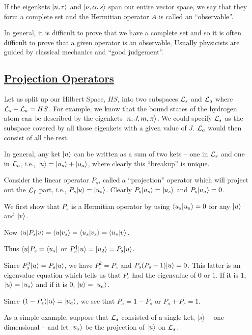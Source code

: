 If the eigenkets $|n,r\rangle$ and $|\nu,\alpha,s\rangle$ span our entire vector space, we say that they form a complete set and the Hermitian operator $A$ is called an ``observable''.\label{observable}

In general, it is difficult to prove that we have a complete set and so it is often difficult to prove that a given operator is an observable, Usually physicists are guided by classical mechanics and ``good judgement''.

\subsection{\underline{Projection Operators}}
Let us split up our Hilbert Space, $HS$, into two subspaces ${\cal{L}}_s$ and ${\cal{L}}_a$ where ${\cal{L}}_s + {\cal{L}}_a = HS$. For example, we know that the bound states of the hydrogen atom can be described by the 
eigenkets $|n,J,m,\pi\rangle$. We could specify ${\cal{L}}_s$ as the subspace covered by all those eigenkets with a given value of $J$. ${\cal{L}}_a$ would then consist of all the rest. 

In general, any ket $|u\rangle$ can be written as a sum of two kets -- one in ${\cal{L}}_s$ and one in ${\cal{L}}_a$, i.e., $|u\rangle = |u_s\rangle + |u_a\rangle$, where clearly this ``breakup'' is unique. 

Consider the linear operator $P_s$, called a ``projection'' operator which will project out the $\cal{L}_s$ part, i.e., $P_s|u\rangle = |u_s\rangle$. Clearly $P_s|u_s\rangle = |u_s\rangle$ and $P_s|u_a\rangle = 0$. 

We first show that $P_s$ is a Hermitian operator by using $\langle u_s|u_a\rangle = 0$ for any $|u\rangle$ and $|v\rangle$. 

Now $\langle u| P_s| v \rangle = \langle u|v_s\rangle = \langle u_s|v_s\rangle = \langle u_s|v\rangle$.

Thus $\langle u|P_s = \langle u_s|$ or $P_s^\dagger|u\rangle = |u_2\rangle = P_s|u\rangle$.

Since $P_s^2 |u\rangle = P_s|u\rangle$, we have $P_s^2 = P_s$ and $P_s(P_s -1)|u\rangle = 0$. This latter is an eigenvalue equation which tells us that $P_s$ had the eigenvalue of $0$ or $1$. If it is $1$, $|u\rangle = |u_s\rangle$ and 
if it is $0$, $|u\rangle = |u_a\rangle$. 

Since $(1-P_s)|u\rangle = |u_a\rangle$, we see that $P_a = 1 - P_s$ or $P_a + P_s = 1$. 

As a simple example, suppose that ${\cal{L}}_s$ consisted of a single ket, $|s\rangle$ -- one dimensional -- and let $|u_s\rangle$ be the projection of $|u\rangle$ on ${\cal{L}}_s$. 


